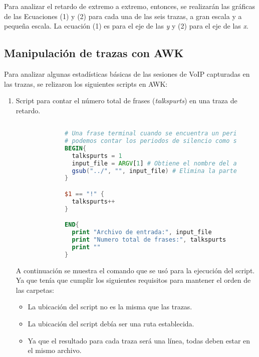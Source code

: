 \noindent Para analizar el retardo de extremo a extremo, entonces, se realizar\'an las gr\'aficas de las Ecuaciones (1) y (2)
para cada una de las seis trazas, a gran escala y a pequeña escala. La ecuaci\'on (1) es para el eje de las \textit{y} y (2)
para el eje de las \textit{x}.

\subsection*{Manipulaci\'on de trazas con AWK}
\noindent Para analizar algunas estad\'isticas b\'asicas de las sesiones de VoIP capturadas en las trazas, se relizaron los
siguientes scripts en AWK:
\begin{enumerate}
  \item Script para contar el n\'umero total de frases (\textit{talkspurts}) en una traza de retardo.
  \begin{figure}[H]
    \centering
    \begin{lstlisting}[frame=single, breaklines=true, basicstyle=\footnotesize\ttfamily, breakatwhitespace=false, 
        columns=flexible, tabsize=2, showstringspaces=false, language=AWK] 
      
        # Una frase terminal cuando se encuentra un periodo de silencio. Por lo tanto
        # podemos contar los periodos de silencio como separadores de frases
        BEGIN{
          talkspurts = 1
          input_file = ARGV[1] # Obtiene el nombre del archivo del parametro de la ejeucion
          gsub("../", "", input_file) # Elimina la parte inicial del parametro para tener nada mas el nombre del archivo
        }

        $1 == "!" { 
          talkspurts++
        }

        END{
          print "Archivo de entrada:", input_file
          print "Numero total de frases:", talkspurts
          print ""
        }

    \end{lstlisting}
    \label{fig:scriptTalksprut}
  \end{figure}

  \noindent A continuaci\'on se muestra el comando que se us\'o para la ejecuci\'on del script. Ya que ten\'ia que cumplir los 
  siguientes requisitos para mantener el orden de las carpetas:
  \begin{itemize}
    \item La ubicaci\'on del script no es la misma que las trazas.
    \item La ubicaci\'on del script deb\'ia ser una ruta establecida.
    \item Ya que el resultado para cada traza ser\'a una l\'inea, todas deben estar en el mismo archivo.
  \end{itemize}
  \begin{figure}[H]
    \centering
    \begin{lstlisting}[frame=single, breaklines=true, basicstyle=\footnotesize\ttfamily, breakatwhitespace=false, 
      columns=flexible, tabsize=2, showstringspaces=false, language=bash]


\end{lstlisting}
\end{figure}
\end{enumerate}
